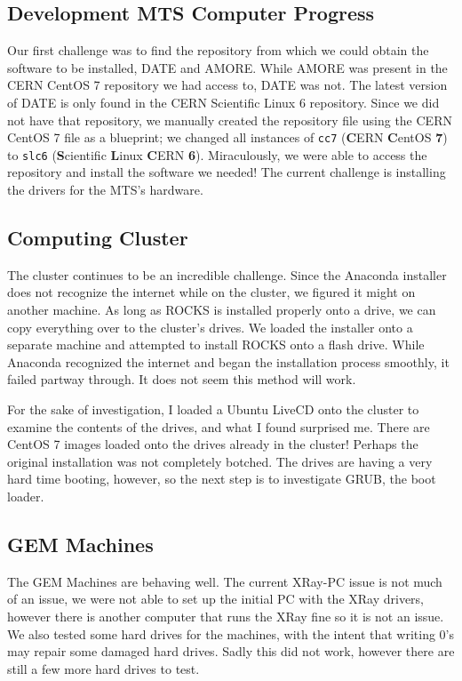 \documentclass[12pt]{article}
\newcommand\tab[1][1cm]{\hspace*{#1}}
\begin{document}
\subsection{Development MTS Computer Progress}

\tab Our first challenge was to find the repository from which we could obtain
the software to be installed, DATE and AMORE. While AMORE was present in the
CERN CentOS 7 repository we had access to, DATE was not. The latest version of
DATE is only found in the CERN Scientific Linux 6 repository. Since we did not
have that repository, we manually created the repository file using the CERN
CentOS 7 file as a blueprint; we changed all instances of {\tt cc7}
(\textbf{C}ERN \textbf{C}entOS \textbf{7}) to {\tt slc6} (\textbf{S}cientific
\textbf{L}inux \textbf{C}ERN \textbf{6}). Miraculously, we were able to access
the repository and install the software we needed! The current challenge is
installing the drivers for the MTS's hardware.

\subsection{Computing Cluster}

\tab The cluster continues to be an incredible challenge. Since the Anaconda
installer does not recognize the internet while on the cluster, we figured it
might on another machine. As long as ROCKS is installed properly onto a drive,
we can copy everything over to the cluster's drives. We loaded the installer
onto a separate machine and attempted to install ROCKS onto a flash drive. While
Anaconda recognized the internet and began the installation process smoothly, it
failed partway through. It does not seem this method will work.

\tab For the sake of investigation, I loaded a Ubuntu LiveCD onto the cluster to
examine the contents of the drives, and what I found surprised me. There are
CentOS 7 images loaded onto the drives already in the cluster! Perhaps the
original installation was not completely botched. The drives are having a very
hard time booting, however, so the next step is to investigate GRUB, the boot
loader.

\subsection{GEM Machines}

\tab The GEM Machines are behaving well. The current XRay-PC issue is not much of an issue, we were not able to set up the initial PC with the XRay drivers, however there is another computer that runs the XRay fine so it is not an issue. We also tested some hard drives for the machines, with the intent that writing 0's may repair some damaged hard drives. Sadly this did not work, however there are still a few more hard drives to test. 
\end{document}
